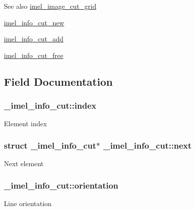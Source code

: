 \begin{DoxySeeAlso}{See also}
\hyperlink{image_8c_a31943792f957de747e49b6dc1fbbab05}{imel\+\_\+image\+\_\+cut\+\_\+grid} 

\hyperlink{info__cut_8c_ad06ec44d23c494c1f501d03de880007e}{imel\+\_\+info\+\_\+cut\+\_\+new} 

\hyperlink{info__cut_8c_aa8e34152e2f5716e6a195ee1b8107f85}{imel\+\_\+info\+\_\+cut\+\_\+add} 

\hyperlink{info__cut_8c_a73ba0a29544436cf4248c71a935560cd}{imel\+\_\+info\+\_\+cut\+\_\+free} 
\end{DoxySeeAlso}


\subsection{Field Documentation}
\subsubsection[{\texorpdfstring{index}{index}}]{ \+\_\+imel\+\_\+info\+\_\+cut\+::index}\hypertarget{struct__imel__info__cut_ae436b332b23852dd64b64b65b6410f64}{}\label{struct__imel__info__cut_ae436b332b23852dd64b64b65b6410f64}
Element index 
\subsubsection[{\texorpdfstring{next}{next}}]{\setlength{\rightskip}{0pt plus 5cm}struct {\bf \+\_\+imel\+\_\+info\+\_\+cut}$\ast$ \+\_\+imel\+\_\+info\+\_\+cut\+::next}\hypertarget{struct__imel__info__cut_a3e0e1c8db6cdc22b7f4247e0b295a0d9}{}\label{struct__imel__info__cut_a3e0e1c8db6cdc22b7f4247e0b295a0d9}
Next element 
\subsubsection[{\texorpdfstring{orientation}{orientation}}]{ \+\_\+imel\+\_\+info\+\_\+cut\+::orientation}\hypertarget{struct__imel__info__cut_a3c2a7e5ecd568b3742a1ac0cdbc9ae9d}{}\label{struct__imel__info__cut_a3c2a7e5ecd568b3742a1ac0cdbc9ae9d}
Line orientation 
